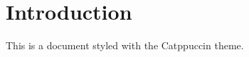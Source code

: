 \documentclass{article} %
\begin{document}
\section{Introduction}
This is a document styled with the Catppuccin theme.
\end{document}

